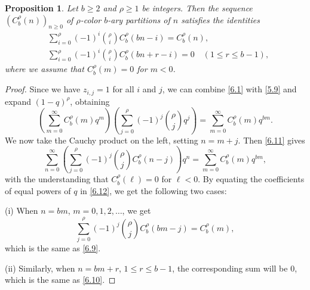 \documentclass[10pt,a4paper]{amsart}
\newtheorem{proposition}{Proposition}
\begin{document}
\begin{proposition}\label{prop:6.5}
Let $b\geq 2$ and $\rho\geq 1$ be integers. Then the sequence
$\left(C_b^\rho(n)\right)_{n\geq 0}$ of $\rho$-color $b$-ary partitions of $n$
satisfies the identities
\begin{align}
&\sum_{i=0}^\rho(-1)^i\binom{\rho}{i}C_b^\rho(bn-i)=C_b^\rho(n),\label{6.9}\\
&\sum_{i=0}^\rho(-1)^i\binom{\rho}{i}C_b^\rho(bn+r-i)=0\quad (1\leq r\leq b-1),
\label{6.10}
\end{align}
where we assume that $C_b^\rho(m)=0$ for $m<0$.
\end{proposition}

\begin{proof}
Since we have $z_{i,j}=1$ for all $i$ and $j$, we can combine \eqref{6.1} with 
\eqref{5.9} and expand $(1-q)^\rho$, obtaining
\begin{equation}\label{6.11}
\left(\sum_{m=0}^\infty C_b^\rho(m)q^m\right)
\left(\sum_{j=0}^\rho(-1)^j\binom{\rho}{j}q^j\right)
= \sum_{m=0}^\infty C_b^\rho(m)q^{bm}.
\end{equation}
We now take the Cauchy product on the left, setting $n=m+j$. Then \eqref{6.11}
gives
\begin{equation}\label{6.12}
\sum_{n=0}^\infty\left(\sum_{j=0}^\rho(-1)^j\binom{\rho}{j}C_b^\rho(n-j)\right)q^n
= \sum_{m=0}^\infty C_b^\rho(m)q^{bm},
\end{equation}
with the understanding that $C_b^\rho(\ell)=0$ for $\ell< 0$. By equating the
coefficients of equal powers of $q$ in \eqref{6.12}, we get the following two
cases:

(i) When $n=bm$, $m=0, 1, 2,\ldots$, we get
\[
\sum_{j=0}^\rho(-1)^j\binom{\rho}{j}C_b^\rho(bm-j) = C_b^\rho(m),
\]
which is the same as \eqref{6.9}.

(ii) Similarly, when $n=bm+r$, $1\leq r\leq b-1$, the corresponding sum will
be 0, which is the same as \eqref{6.10}.
\end{proof}
\end{document}
